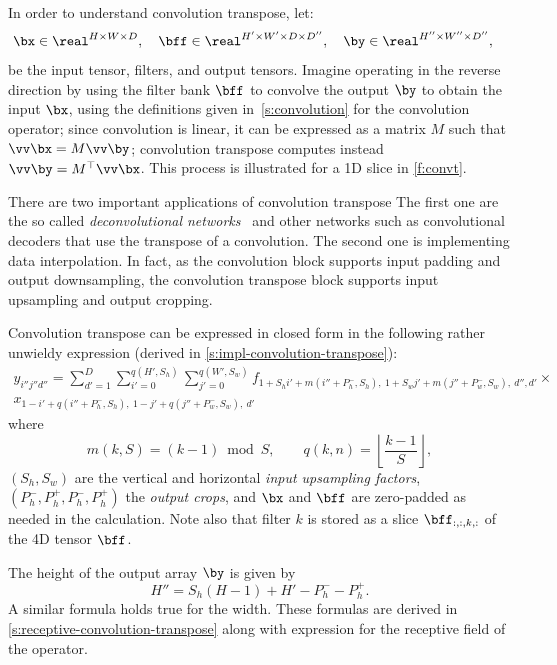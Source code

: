 In order to understand convolution transpose, let:
\[
 \bx\in\real^{H \times W \times D}, \quad
 \bff\in\real^{H' \times W' \times D \times D''}, \quad
 \by\in\real^{H'' \times W'' \times D''}, \quad
\]
be the input tensor, filters, and output tensors. Imagine operating in the reverse direction by using the filter bank $\bff$ to convolve the output $\by$ to obtain the input $\bx$, using the definitions given in~\autoref{s:convolution} for the convolution operator; since convolution is linear, it can be expressed as a matrix $M$ such that  $\vv \bx = M \vv\by$; convolution transpose computes instead $\vv \by = M^\top \vv \bx$. This process is illustrated for a 1D slice in \autoref{f:convt}.

There are two important applications of convolution transpose The first one are the so called \emph{deconvolutional networks}~\cite{zeiler14visualizing} and other networks such as convolutional decoders that use the transpose of a convolution. The second one is implementing data interpolation. In fact, as the convolution block supports input padding and output downsampling, the convolution transpose block supports input upsampling and output cropping. 

Convolution transpose can be expressed in closed form in the following rather unwieldy expression (derived in \autoref{s:impl-convolution-transpose}):
\begin{multline}\label{e:convt}
y_{i''j''d''} = 
 \sum_{d'=1}^{D}
 \sum_{i'=0}^{q(H',S_h)}
 \sum_{j'=0}^{q(W',S_w)}
f_{
1+ S_hi' + m(i''+ P_h^-, S_h),\ %
1+ S_wj' + m(j''+ P_w^-, S_w),\ %
d'',
d'
} 
\times \\
x_{
1 - i' + q(i''+P_h^-,S_h),\ %
1 - j' + q(j''+P_w^-,S_w),\ %
d'
}
\end{multline}
where
\[
m(k,S) = (k - 1) \bmod S,
\qquad
q(k,n) = \left\lfloor \frac{k-1}{S} \right\rfloor,
\]
$(S_h,S_w)$ are the vertical and horizontal \emph{input upsampling factors},  $(P_h^-,P_h^+,P_h^-,P_h^+)$ the \emph{output crops}, and $\bx$ and $\bff$ are zero-padded as needed in the calculation. Note also that filter $k$ is stored as a slice $\bff_{:,:,k,:}$ of the 4D tensor $\bff$.

The height of the output array $\by$ is given by
\[
  H'' = S_h (H - 1) + H' -P^-_h - P^+_h.
\]
A similar formula holds true for the width. These formulas are derived in \autoref{s:receptive-convolution-transpose} along with expression for the receptive field of the operator.

